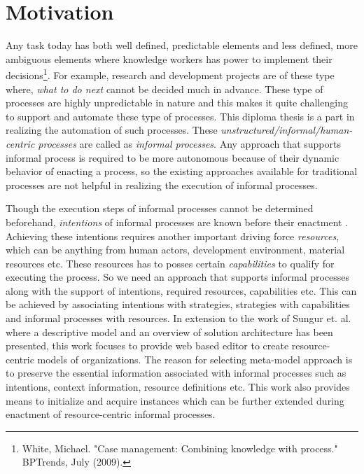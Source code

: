 \section{Motivation}
\label{sec:motivation}
Any task today has both well defined, predictable elements and less defined, more ambiguous elements where knowledge workers has power to implement their decisions\footnote{White, Michael. "Case management: Combining knowledge with process." BPTrends, July (2009).}. For example, research and development projects are of these type where, \textit{what to do next} cannot be decided much in advance. These type of processes are highly unpredictable in nature and this makes it quite challenging to support and automate these type of processes. This diploma thesis is a part in realizing the automation of such processes. These \textit{unstructured/informal/human-centric processes} are called as \textit{informal processes}\cite{Sungur2014}. Any approach that supports informal process is required to be more autonomous because of their dynamic behavior of enacting a process, so the existing approaches available for traditional processes are not helpful in realizing the execution of informal processes.  


Though the execution steps of informal processes cannot be determined beforehand, \textit{intentions} of informal processes are known before their enactment \cite{Sungur2015}. Achieving these intentions requires another important driving force \textit{resources}, which can be anything from human actors, development environment, material resources etc. These resources has to posses certain \textit{capabilities} to qualify for executing the process. So we need an approach that supports informal processes along with the support of intentions, required resources, capabilities etc. This can be achieved by associating intentions with strategies, strategies with capabilities and informal processes with resources. In extension to the work of Sungur et. al. \cite{Sungur2014a} where a descriptive model and an overview of solution architecture has been presented, this work  focuses to provide web based  editor to create resource-centric models of organizations. The reason for selecting meta-model approach is to preserve the essential information associated with informal processes such as intentions, context information, resource definitions etc.  This work also provides means to initialize and acquire instances which can be further extended during enactment of resource-centric informal processes.  

